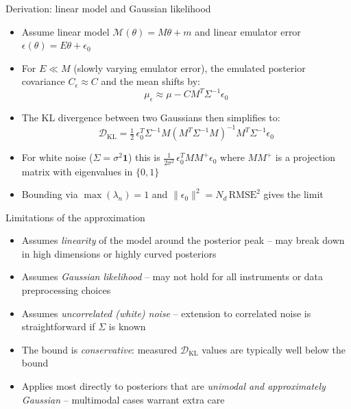 \documentclass[aspectratio=169, 12pt]{beamer}
\begin{document}
\begin{frame}{Derivation: linear model and Gaussian likelihood}
    \begin{itemize}
        \item Assume linear model $\mathcal{M}(\theta) = M\theta + m$ and
              linear emulator error $\epsilon(\theta) = E\theta + \epsilon_0$
        \item For $E \ll M$ (slowly varying emulator error), the emulated
              posterior covariance $C_\epsilon \approx C$ and the mean shifts by:
              \[
                  \mu_\epsilon \approx \mu - C M^T \Sigma^{-1} \epsilon_0
              \]
        \item The KL divergence between two Gaussians then simplifies to:
              \[
                  \mathcal{D}_\mathrm{KL} = \tfrac{1}{2}\,
                  \epsilon_0^T \Sigma^{-1} M \!\left(M^T \Sigma^{-1} M\right)^{-1}\!
                  M^T \Sigma^{-1} \epsilon_0
              \]
        \item For white noise ($\Sigma = \sigma^2 \mathbf{1}$) this is
              $\frac{1}{2\sigma^2}\,\epsilon_0^T M M^+ \epsilon_0$
              where $M M^+$ is a projection matrix with eigenvalues in $\{0,1\}$
        \item Bounding via $\max(\lambda_n) = 1$ and $\|\epsilon_0\|^2 = N_d\,\mathrm{RMSE}^2$
              gives the limit 
    \end{itemize}
\end{frame}

\begin{frame}{Limitations of the approximation}
    \begin{itemize}
        \item Assumes \textit{linearity} of the model around the posterior peak --
              may break down in high dimensions or highly curved posteriors
        \item Assumes \textit{Gaussian likelihood} -- may not hold for all
              instruments or data preprocessing choices
        \item Assumes \textit{uncorrelated (white) noise} -- extension to
              correlated noise is straightforward if $\Sigma$ is known
        \item The bound is \textit{conservative}: measured
              $\mathcal{D}_\mathrm{KL}$ values are typically well below the bound
        \item Applies most directly to posteriors that are \textit{unimodal and
              approximately Gaussian} -- multimodal cases warrant extra care
    \end{itemize}
\end{frame}

\end{document}
